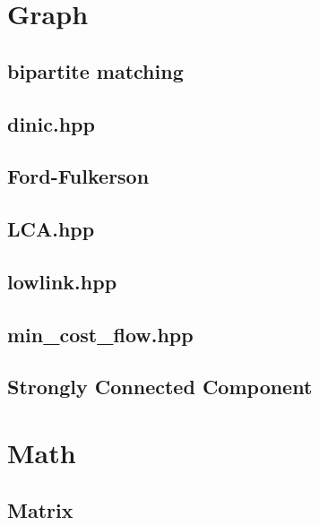 \documentclass[dvipdfmx, 11pt]{jsarticle}
\begin{document}
\section{Graph}

\subsection{bipartite matching}


\subsection{dinic.hpp}


\subsection{Ford-Fulkerson}


\subsection{LCA.hpp}


\subsection{lowlink.hpp}


\subsection{min\_cost\_flow.hpp}


\subsection{Strongly Connected Component}



\section{Math}

\subsection{Matrix}

\end{document}
